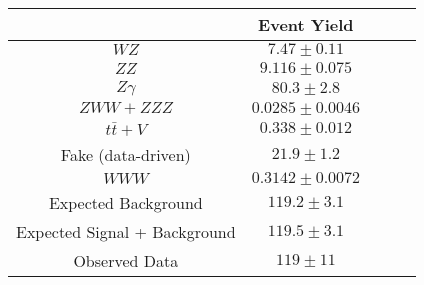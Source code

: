 \begin{tabular}{|c||c|c|c|c|}
\hline
 & Event Yield\\ 
\hline\hline
$WZ$ &  $7.47 \pm 0.11$\\ 
$ZZ$ &  $9.116 \pm 0.075$\\ 
$Z\gamma$ &  $80.3 \pm 2.8$\\ 
$ZWW+ZZZ$ &  $0.0285 \pm 0.0046$\\ 
$t\bar{t}+V$ &  $0.338 \pm 0.012$\\ 
Fake (data-driven) &  $21.9 \pm 1.2$\\ 
$WWW$ &  $0.3142 \pm 0.0072$\\ 
\hline
Expected Background &  $119.2 \pm 3.1$\\ 
Expected Signal + Background &  $119.5 \pm 3.1$\\ 
\hline
Observed Data &  $119 \pm 11$\\ 
\hline
\end{tabular}
